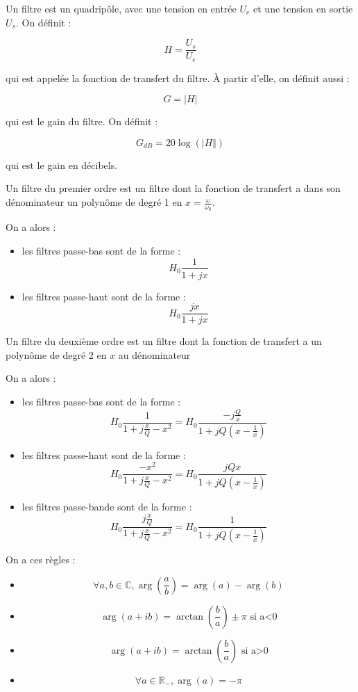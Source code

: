 \documentclass[a4paper,12pt]{book}
\newcommand{\Def}[2]{\begin{tcolorbox}[colback=white,colframe=red!10!green!20!blue!75!, title=Définition : #1]#2\end{tcolorbox}}
\newcommand{\Thr}[2]{\begin{tcolorbox}[sharp corners, colback=white,colframe=red!10!blue!30!green!75!, title=Théorème : #1]#2\end{tcolorbox}}
\def\R{\mathbb{R}}
\def\C{\mathbb{C}}
\begin{document}
\Def{Fonction de Transfert}{Un filtre est un quadripôle, avec une tension en entrée $U_e$ et une tension en sortie $U_s$. On définit :
\par $$H = \frac{U_s}{U_e}$$
\par qui est appelée la fonction de transfert du filtre. À partir d'elle, on définit aussi :
\par $$G = \vert H\vert$$
\par qui est le gain du filtre. On définit :
\par $$G_{dB} = 20\log(\vert H\Vert)$$
\par qui est le gain en décibels.}
\Def{Ordre des filtres}{Un filtre du premier ordre est un filtre dont la fonction de transfert a dans son dénominateur un polynôme de degré 1 en $x=\frac{\omega}{\omega_0}$.
\par On a alors :\begin{itemize}
\item les filtres passe-bas sont de la forme : $$H_0\frac{1}{1+jx}$$
\item les filtres passe-haut sont de la forme : $$H_0\frac{jx}{1+jx}$$
\end{itemize}
Un filtre du deuxième ordre est un filtre dont la fonction de transfert a un polynôme de degré 2 en $x$ au dénominateur
\par On a alors :\begin{itemize}
\item les filtres passe-bas sont de la forme : $$H_0\frac{1}{1+j\frac{x}{Q}-x^2} = H_0\frac{-j\frac{Q}{x}}{1+jQ\left(x-\frac{1}{x}\right)}$$
\item les filtres passe-haut sont de la forme : $$H_0\frac{-x^2}{1+j\frac{x}{Q}-x^2} = H_0\frac{jQx}{1+jQ\left(x-\frac{1}{x}\right)}$$
\item les filtres passe-bande sont de la forme : $$H_0\frac{j\frac{x}{Q}}{1+j\frac{x}{Q}-x^2} = H_0\frac{1}{1+jQ\left(x-\frac{1}{x}\right)}$$
\end{itemize}}
\Thr{Calcul pratique d'argument}{On a ces règles :\begin{itemize}
\item $$\forall a,b\in\C, \arg\left(\frac{a}{b}\right) = \arg(a)-\arg(b)$$
\item $$\arg(a+ib) = \arctan\left(\frac{b}{a}\right)\pm\pi\text{ si a<0}$$
\item $$\arg(a+ib) = \arctan\left(\frac{b}{a}\right)\text{ si a>0}$$
\item $$\forall a\in\R_-,\arg(a) = -\pi$$
\end{itemize}}
\end{document}
